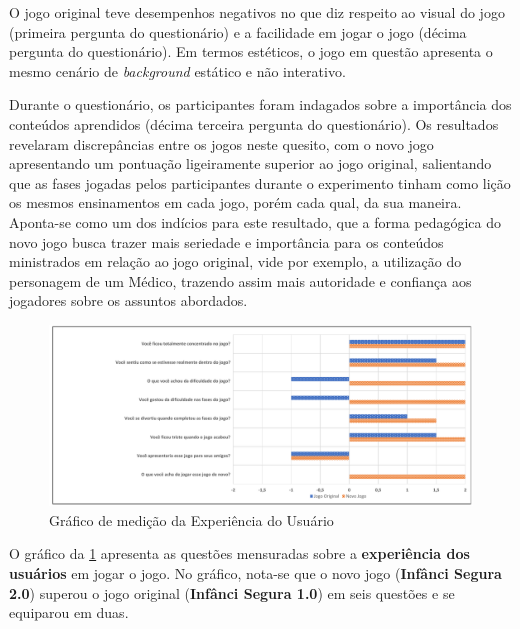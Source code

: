 \documentclass[alpha-refs,brazilian]{RBCA_v2.0}
\begin{document}
O jogo original teve desempenhos negativos no que diz respeito ao visual do jogo (primeira pergunta do questionário) e a facilidade em jogar o jogo (décima pergunta do questionário). Em termos estéticos, o jogo em questão apresenta o mesmo cenário de \textit{background} estático e não interativo. 

\newpage

Durante o questionário, os participantes foram indagados sobre a importância dos conteúdos aprendidos (décima terceira pergunta do questionário). Os resultados revelaram discrepâncias entre os jogos neste quesito, com o novo jogo apresentando um pontuação ligeiramente superior ao jogo original, salientando que as fases jogadas pelos participantes durante o experimento tinham como lição os mesmos ensinamentos em cada jogo, porém cada qual, da sua maneira. Aponta-se como um dos indícios para este resultado, que a forma pedagógica do novo jogo busca trazer mais seriedade e importância para os conteúdos ministrados em relação ao jogo original, vide por exemplo, a utilização do personagem de um Médico, trazendo assim mais autoridade e confiança aos jogadores sobre os assuntos abordados. 


 \begin{figure}[ht]
  \centering
  \includegraphics[width=1.05\linewidth]{Resultados/ExperienciaUsuario.pdf}
  \caption{Gráfico de medição da Experiência do Usuário}
  \label{fig:ExperienciaUsuario}
\end{figure} 


O gráfico da \cref{fig:ExperienciaUsuario} apresenta as questões mensuradas sobre a \textbf{experiência dos usuários} em jogar o jogo. No gráfico, nota-se que o novo jogo (\textbf{Infânci Segura 2.0}) superou o jogo original (\textbf{Infânci Segura 1.0}) em seis questões e se equiparou em duas. %
\end{document}
